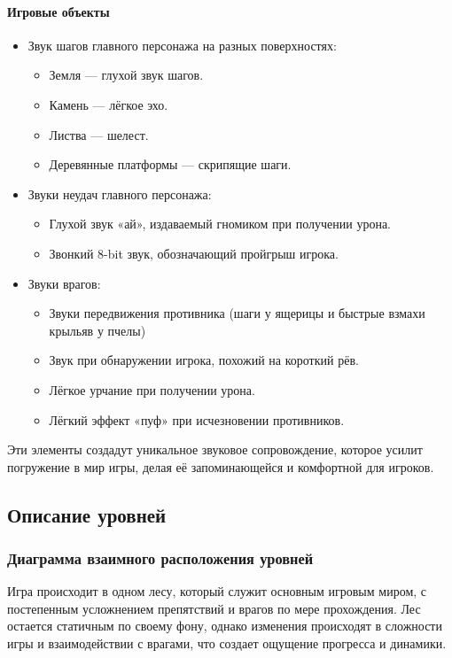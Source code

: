 \documentclass{article}
\begin{document}
\paragraph{Игровые объекты}  
\begin{itemize}
    \item Звук шагов главного персонажа на разных поверхностях:  
    \begin{itemize}
        \item Земля — глухой звук шагов.  
        \item Камень — лёгкое эхо.  
        \item Листва — шелест.  
        \item Деревянные платформы — скрипящие шаги.  
    \end{itemize}
    \item Звуки неудач главного персонажа:  
    \begin{itemize}
        \item Глухой звук «ай», издаваемый гномиком при получении урона.  
        \item Звонкий 8-bit звук, обозначающий пройгрыш игрока.  
    \end{itemize}
    \item Звуки врагов:  
    \begin{itemize}
        \item Звуки передвижения противника (шаги у ящерицы и быстрые взмахи крыльяв у пчелы)
        \item Звук при обнаружении игрока, похожий на короткий рёв.
        \item Лёгкое урчание при получении урона.  
        \item Лёгкий эффект «пуф» при исчезновении противников.  
    \end{itemize}
\end{itemize}

Эти элементы создадут уникальное звуковое сопровождение, которое усилит погружение в мир игры, делая её запоминающейся и комфортной для игроков.


\subsection{Описание уровней}

\subsubsection{Диаграмма взаимного расположения уровней}
Игра происходит в одном лесу, который служит основным игровым миром, с постепенным усложнением препятствий и врагов по мере прохождения. Лес остается статичным по своему фону, однако изменения происходят в сложности игры и взаимодействии с врагами, что создает ощущение прогресса и динамики.
\end{document}
